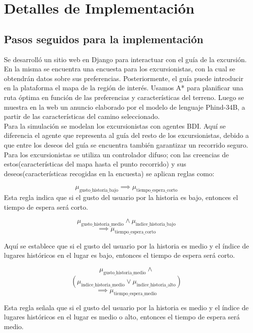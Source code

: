 \documentclass[10pt,twocolumn]{article}
\begin{document}
	\section{Detalles de Implementación}
	
	\subsection{Pasos seguidos para la implementación}
	Se desarrolló un sitio web en Django para interactuar con el guía de la excursión. En la misma se encuentra una encuesta para los excursionistas, con la cual se obtendrán datos sobre sus preferencias. Posteriormente, el guía puede introducir en la plataforma el mapa de la región de interés. Usamos A* para planificar una ruta óptima en función de las preferencias y características del terreno. Luego se muestra en la web un anuncio elaborado por el modelo de lenguaje Phind-34B, a partir de las características del camino seleccionado.\\
	Para la simulación se modelan los excursionistas con agentes BDI. Aquí se diferencia el agente que representa al guía del resto de los excursionistas, debido a que entre los deseos del guía se encuentra también garantizar un recorrido seguro. Para los excursionistas se utiliza un controlador difuso; con las creencias de estos(características del mapa hasta el punto recorrido) y sus deseos(características recogidas en la encuesta) se aplican reglas como:
	
	$$
	 \mu_{\text{gusto\_historia\_bajo}} \implies \mu_{\text{tiempo\_espera\_corto}}
	$$
	Esta regla indica que si el gusto del usuario por la historia es bajo, entonces el tiempo de espera será corto.
	
	$$
	\mu_{\text{gusto\_historia\_medio}} \land \mu_{\text{indice\_historia\_bajo}}$$
	$$\implies \mu_{\text{tiempo\_espera\_corto}}$$
	
	
	Aquí se establece que si el gusto del usuario por la historia es medio y el índice de lugares históricos en el lugar es bajo, entonces el tiempo de espera será corto.
	
	$$
		\mu_{\text{gusto\_historia\_medio}}  \land $$
		 $$ \left( \mu_{\text{indice\_historia\_medio}}	
		 \lor \mu_{\text{indice\_historia\_alto}} \right)$$
		$$\implies \mu_{\text{tiempo\_espera\_medio}}$$

	Esta regla señala que si el gusto del usuario por la historia es medio y el índice de lugares históricos en el lugar es medio o alto, entonces el tiempo de espera será medio.
	
\end{document}
